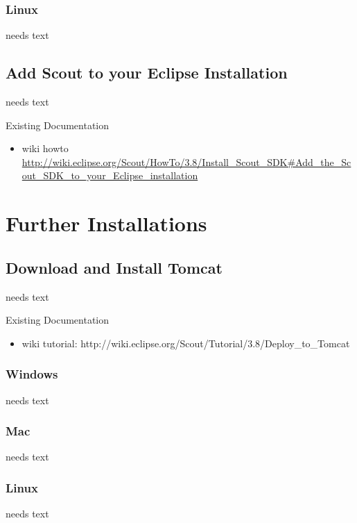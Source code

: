 \documentclass[a4paper,10pt,twoside]{book}
\begin{document}
\subsection{Linux}
needs text

\section{Add Scout to your Eclipse Installation}
needs text

\noindent Existing Documentation
\begin{itemize}
  \item wiki howto \url{http://wiki.eclipse.org/Scout/HowTo/3.8/Install_Scout_SDK#Add_the_Scout_SDK_to_your_Eclipse_installation}
\end{itemize}


\chapter{Further Installations}

\section{Download and Install Tomcat}
needs text

\noindent Existing Documentation
\begin{itemize}
  \item wiki tutorial: {http://wiki.eclipse.org/Scout/Tutorial/3.8/Deploy_to_Tomcat}
\end{itemize}

\subsection{Windows}
needs text

\subsection{Mac}
needs text

\subsection{Linux}
needs text

\end{document}
